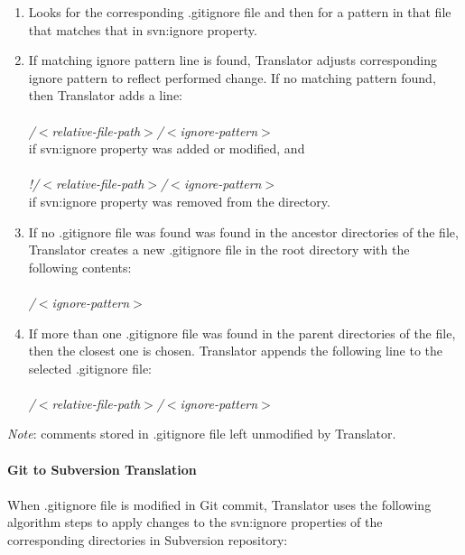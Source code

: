\begin{enumerate}
\compactlist
\item Looks for the corresponding .gitignore file and then for a pattern in that file that matches that in svn:ignore property.\\
\item If matching ignore pattern line is found, Translator adjusts corresponding ignore pattern to reflect performed change.
If no matching pattern found, then Translator adds a line:\\\\
\emph{/$<$relative-file-path$>$/$<$ignore-pattern$>$}\\
if svn:ignore property was added or modified, and \\\\
\emph{!/$<$relative-file-path$>$/$<$ignore-pattern$>$}\\
if svn:ignore property was removed from the directory.\\
\item If no .gitignore file was found was found in the ancestor directories of the file, Translator creates a new .gitignore file in the root directory with the following contents:\\\\
\emph{/$<$ignore-pattern$>$}\\
\item 
If more than one .gitignore file was found in the parent directories of the file, then the closest one is chosen. 
Translator appends the following line to the selected .gitignore file:\\\\
\emph{/$<$relative-file-path$>$/$<$ignore-pattern$>$}\\
\end{enumerate}
\emph{Note}: comments stored in .gitignore file left unmodified by Translator.\\
\\
\textbf{Git to Subversion Translation}
\\\\
When .gitignore file is modified in Git commit, Translator uses the following algorithm steps to apply changes to the svn:ignore properties of the corresponding directories in Subversion repository:

